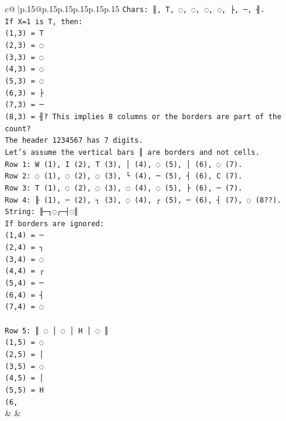 \documentclass{article}
\begin{document}
{\begin{supertabular}{c@{$\;$}|p{.15\linewidth}@{}p{.15\linewidth}p{.15\linewidth}p{.15\linewidth}p{.15\linewidth}p{.15\linewidth}}
{{{\texttt{Chars: ║, T, ◌, ◌, ◌, ◌, ├, ─, ╢.} \\
\texttt{If X=1 is T, then:} \\
\texttt{(1,3) = T} \\
\texttt{(2,3) = ◌} \\
\texttt{(3,3) = ◌} \\
\texttt{(4,3) = ◌} \\
\texttt{(5,3) = ◌} \\
\texttt{(6,3) = ├} \\
\texttt{(7,3) = ─} \\
\texttt{(8,3) = ╢? This implies 8 columns or the borders are part of the count?} \\
\texttt{The header 1234567 has 7 digits.} \\
\texttt{Let's assume the vertical bars ║ are borders and not cells.} \\
\texttt{Row 1: W (1), I (2), T (3), │ (4), ◌ (5), │ (6), ◌ (7).} \\
\texttt{Row 2: ◌ (1), ◌ (2), ◌ (3), └ (4), ─ (5), ┤ (6), C (7).} \\
\texttt{Row 3: T (1), ◌ (2), ◌ (3), ◌ (4), ◌ (5), ├ (6), ─ (7).} \\
\texttt{Row 4: ╟ (1), ─ (2), ┐ (3), ◌ (4), ┌ (5), ─ (6), ┤ (7), ◌ (8??).} \\
\texttt{String: ╟─┐◌┌─┤◌║} \\
\texttt{If borders are ignored:} \\
\texttt{(1,4) = ─} \\
\texttt{(2,4) = ┐} \\
\texttt{(3,4) = ◌} \\
\texttt{(4,4) = ┌} \\
\texttt{(5,4) = ─} \\
\texttt{(6,4) = ┤} \\
\texttt{(7,4) = ◌} \\
\\ 
\texttt{Row 5: ║ ◌ │ ◌ │ H │ ◌ ║} \\
\texttt{(1,5) = ◌} \\
\texttt{(2,5) = │} \\
\texttt{(3,5) = ◌} \\
\texttt{(4,5) = │} \\
\texttt{(5,5) = H} \\
\texttt{(6,} \\
            }
        }
    }
    & & \\ \\


\end{supertabular}}
\end{document}
